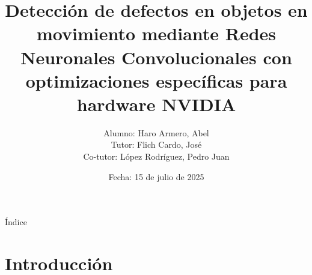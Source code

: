 \documentclass[spanish]{beamer}
\title{Detección de defectos en objetos en movimiento mediante Redes Neuronales Convolucionales con optimizaciones específicas para hardware NVIDIA}
\date{Fecha: 15 de julio de 2025}
\author{Alumno: Haro Armero, Abel \\ Tutor: Flich Cardo, José \\ Co-tutor: López Rodríguez, Pedro Juan}
\begin{document}
\begin{frame}
    \titlepage
\end{frame}

\begin{frame}{Índice}
    \small\tableofcontents
\end{frame}

\section{Introducción}

\footnotesize
\end{document}
